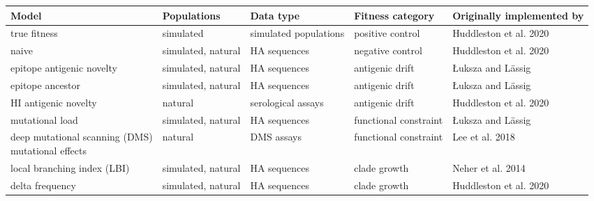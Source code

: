 \begin{tabular*}{1.4\textwidth}{lllll}
\toprule
Model                                                        & Populations        & Data type             & Fitness category      & Originally implemented by                   \\
\midrule
true fitness                                                 & simulated          & simulated populations & positive control      & Huddleston et al. 2020                      \\
naive                                                        & simulated, natural & HA sequences          & negative control      & Huddleston et al. 2020                      \\
epitope antigenic novelty                                    & simulated, natural & HA sequences          & antigenic drift       & {\L}uksza and L\"assig \cite{Luksza:2014hj} \\
epitope ancestor                                             & simulated, natural & HA sequences          & antigenic drift       & {\L}uksza and L\"assig \cite{Luksza:2014hj} \\
HI antigenic novelty                                         & natural            & serological assays    & antigenic drift       & Huddleston et al. 2020                      \\
mutational load                                              & simulated, natural & HA sequences          & functional constraint & {\L}uksza and L\"assig \cite{Luksza:2014hj} \\
\makecell{deep mutational scanning (DMS) \\ mutational effects} & natural            & DMS assays            & functional constraint & Lee et al. 2018 \cite{Lee2018}              \\
local branching index (LBI)                                  & simulated, natural & HA sequences          & clade growth          & Neher et al. 2014 \cite{Neher:2014eu}       \\
delta frequency                                              & simulated, natural & HA sequences          & clade growth          & Huddleston et al. 2020                      \\
\bottomrule
\end{tabular*}
